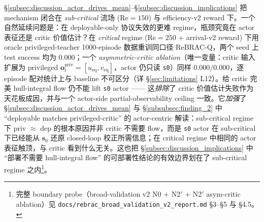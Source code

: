 \S\ref{subsec:discussion_actor_drives_mean}--\S\ref{subsec:discussion_implications} 把 mechanism 闭合在 \emph{sub-critical} 流场 ($\mathrm{Re} = 150$) 与 efficiency-v2 reward 下。一个自然延续问题是：在 deployable-only 协议失效的更难 regime，瓶颈究竟在 actor 表征还是 critic 价值估计？在 \emph{critical} regime ($\mathrm{Re} = 250$ + arrival-v2 reward) 下用 oracle privileged-teacher 1000-episode 数据重训同口径 ReBRAC-Q，两个 seed 上 test success 均为 $0.000$；一个 \emph{asymmetric-critic ablation}（唯一变量：critic 输入扩展为 privileged $\mathbf{o}_t^{\mathrm{priv}} = [u_{\mathrm{eq}}, v_{\mathrm{eq}}]$，actor 仍只读 \texttt{s0}）同样 $0.000/0.000$，逐 episode 配对统计上与 baseline 不可区分（详 \S\ref{sec:limitations} L12）。给 critic 完美 hull-integral flow 仍不能 lift \texttt{s0} actor —— 这\emph{排除}了 critic 价值估计失败作为天花板成因，并与一个 actor-side partial-observability ceiling 一致。它\emph{加强}了 \S\ref{subsec:discussion_actor_drives_mean} 与 \S\ref{subsubsec:finding_2} 中 ``deployable matches privileged-critic'' 的 actor-centric 解读：sub-critical regime 下 priv $\approx$ dep 的根本原因并非 critic 不需要 flow，而是 \texttt{s0} actor 在 sub-critical 下已经能从 $\mathbf{s}_0$ 还原 closed-loop 校正所需信息；在 critical regime 中相同的 actor 表征触顶，与 critic 看到什么无关。这也把 \S\ref{subsec:discussion_implications} 中 ``部署不需要 hull-integral flow'' 的可部署性结论的有效边界划在了 sub-critical regime 之内\footnote{完整 boundary probe（broad-validation v2 N0 + N2$'$ + N2$'$ asym-critic ablation）见 \texttt{docs/rebrac\_broad\_validation\_v2\_report.md} \S 3--\S 5 与 \S 4.5。}。
